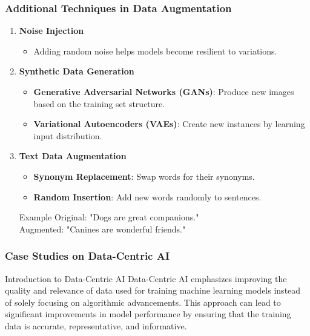 \documentclass[aspectratio=169]{beamer}
\begin{document}
\begin{frame}[fragile]
    \frametitle{Additional Techniques in Data Augmentation}
    \begin{enumerate}[resume]
        \item \textbf{Noise Injection}
        \begin{itemize}
            \item Adding random noise helps models become resilient to variations.
        \end{itemize}
        \item \textbf{Synthetic Data Generation}
        \begin{itemize}
            \item \textbf{Generative Adversarial Networks (GANs)}: Produce new images based on the training set structure.
            \item \textbf{Variational Autoencoders (VAEs)}: Create new instances by learning input distribution.
        \end{itemize}
        \item \textbf{Text Data Augmentation}
        \begin{itemize}
            \item \textbf{Synonym Replacement}: Swap words for their synonyms.
            \item \textbf{Random Insertion}: Add new words randomly to sentences.
        \end{itemize}
        \begin{block}{Example}
            Original: "Dogs are great companions." \\
            Augmented: "Canines are wonderful friends."
        \end{block}
    \end{enumerate}
\end{frame}

\begin{frame}[fragile]
    \frametitle{Case Studies on Data-Centric AI}
    \begin{block}{Introduction to Data-Centric AI}
        Data-Centric AI emphasizes improving the quality and relevance of data used for training machine learning models instead of solely focusing on algorithmic advancements. This approach can lead to significant improvements in model performance by ensuring that the training data is accurate, representative, and informative.
    \end{block}
\end{frame}
\end{document}
